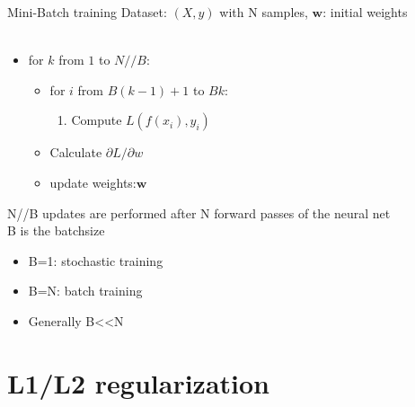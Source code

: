 \documentclass[handout]{beamer}
\begin{document}
\begin{frame}{Mini-Batch training}
Dataset: $(X,y)$ with N samples, $\mathbf{w}$: initial weights\\~\\
\begin{itemize}
    \item for $k$ from $1$ to  $N//B$:
\begin{itemize}
 \item for $i$ from $B(k-1)+1$ to $Bk$:\\
     \begin{enumerate}
    \item Compute $L(f(x_i),y_i)$\\
    \end{enumerate}
    \item Calculate $\partial L/\partial w$\\
    \item update weights:$\mathbf{w}$
    \end{itemize}
\end{itemize}
N//B updates are performed after N forward passes of the neural net\\
\alert{B is the batchsize}
\begin{itemize}
    \item \alert{B=1}: stochastic training
    \item \alert{B=N}: batch training
    \item Generally B<<N
\end{itemize} 

    
\end{frame}


\section{L1/L2 regularization}
\end{document}
